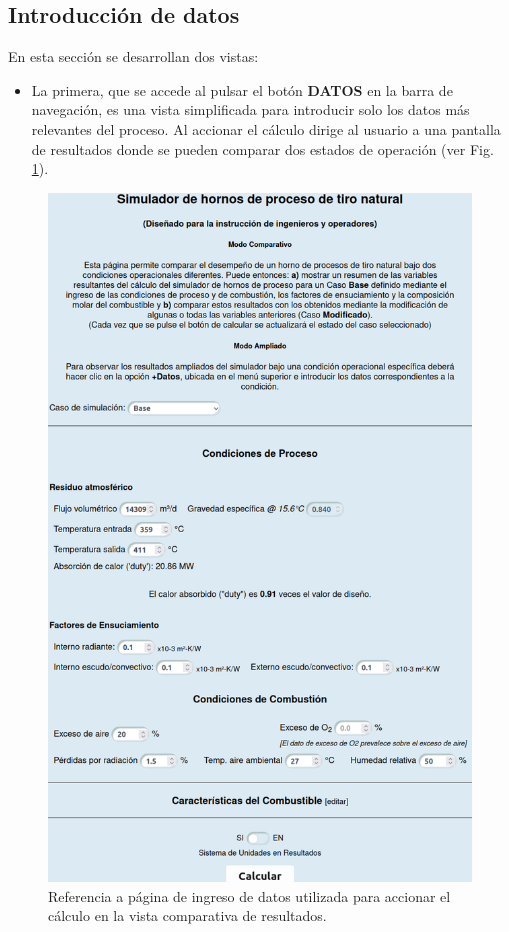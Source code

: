 \subsection{Introducción de datos}
\par En esta sección se desarrollan dos vistas:
\begin{itemize}
    \item La primera, que se accede al pulsar el botón \textbf{DATOS} en la barra de navegación, es una vista simplificada para introducir solo los datos más relevantes del proceso. Al accionar el cálculo dirige al usuario a una pantalla de resultados donde se pueden comparar dos estados de operación (ver Fig. \ref{fig:datos}).
\end{itemize}
\begin{figure}[H] \begin{center}
\includegraphics[scale=0.3]{images/datos}
\caption[Página de ingreso de datos para comparación]{Referencia a página de ingreso de datos utilizada para accionar el cálculo en la vista comparativa de resultados.}
\label{fig:datos} \end{center} \end{figure}
